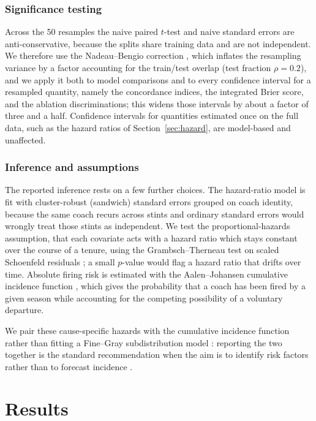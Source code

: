 \documentclass[12pt,USenglish]{article}
\begin{document}
\subsubsection{Significance testing}

Across the 50 resamples the naive paired $t$-test and naive standard errors are anti-conservative, because the splits share training data and are not independent. We therefore use the Nadeau--Bengio correction \citep{nadeau2003}, which inflates the resampling variance by a factor accounting for the train/test overlap (test fraction $\rho = 0.2$), and we apply it both to model comparisons and to every confidence interval for a resampled quantity, namely the concordance indices, the integrated Brier score, and the ablation discriminations; this widens those intervals by about a factor of three and a half. Confidence intervals for quantities estimated once on the full data, such as the hazard ratios of Section~\ref{sec:hazard}, are model-based and unaffected.

\subsubsection{Inference and assumptions}

The reported inference rests on a few further choices. The hazard-ratio model is fit with cluster-robust (sandwich) standard errors \citep{lin1989} grouped on coach identity, because the same coach recurs across stints and ordinary standard errors would wrongly treat those stints as independent. We test the proportional-hazards assumption, that each covariate acts with a hazard ratio which stays constant over the course of a tenure, using the Grambsch--Therneau test on scaled Schoenfeld residuals \citep{grambsch1994}; a small $p$-value would flag a hazard ratio that drifts over time. Absolute firing risk is estimated with the Aalen--Johansen cumulative incidence function \citep{aalen1978}, which gives the probability that a coach has been fired by a given season while accounting for the competing possibility of a voluntary departure.

We pair these cause-specific hazards with the cumulative incidence function rather than fitting a Fine--Gray subdistribution model \citep{finegray1999}: reporting the two together is the standard recommendation when the aim is to identify risk factors rather than to forecast incidence \citep{austin2016}.

\section{Results}
\end{document}
